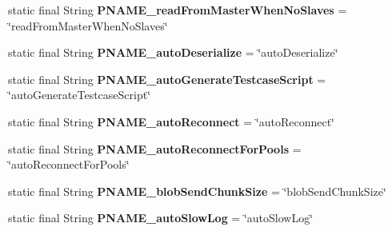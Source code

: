 \begin{DoxyCompactItemize}
static final String {\bfseries P\+N\+A\+M\+E\+\_\+read\+From\+Master\+When\+No\+Slaves} = \char`\"{}read\+From\+Master\+When\+No\+Slaves\char`\"{}
\item 
\mbox{\label{classcom_1_1mysql_1_1cj_1_1conf_1_1_property_definitions_ab3efc775d4d19fa8553c518063f45596}} 
static final String {\bfseries P\+N\+A\+M\+E\+\_\+auto\+Deserialize} = \char`\"{}auto\+Deserialize\char`\"{}
\item 
\mbox{\label{classcom_1_1mysql_1_1cj_1_1conf_1_1_property_definitions_a96991c41e4521168671ca79abc4354bb}} 
static final String {\bfseries P\+N\+A\+M\+E\+\_\+auto\+Generate\+Testcase\+Script} = \char`\"{}auto\+Generate\+Testcase\+Script\char`\"{}
\item 
\mbox{\label{classcom_1_1mysql_1_1cj_1_1conf_1_1_property_definitions_a8397ead57bfb1f84df15217b88d9b9b8}} 
static final String {\bfseries P\+N\+A\+M\+E\+\_\+auto\+Reconnect} = \char`\"{}auto\+Reconnect\char`\"{}
\item 
\mbox{\label{classcom_1_1mysql_1_1cj_1_1conf_1_1_property_definitions_acb67126ce870368616adf3d97df95047}} 
static final String {\bfseries P\+N\+A\+M\+E\+\_\+auto\+Reconnect\+For\+Pools} = \char`\"{}auto\+Reconnect\+For\+Pools\char`\"{}
\item 
\mbox{\label{classcom_1_1mysql_1_1cj_1_1conf_1_1_property_definitions_ac26d6d79ee4782897033246f468263d4}} 
static final String {\bfseries P\+N\+A\+M\+E\+\_\+blob\+Send\+Chunk\+Size} = \char`\"{}blob\+Send\+Chunk\+Size\char`\"{}
\item 
\mbox{\label{classcom_1_1mysql_1_1cj_1_1conf_1_1_property_definitions_a564d59b0940a7498eacad705862e7b7c}} 
static final String {\bfseries P\+N\+A\+M\+E\+\_\+auto\+Slow\+Log} = \char`\"{}auto\+Slow\+Log\char`\"{}
\item 
\mbox{\label{classcom_1_1mysql_1_1cj_1_1conf_1_1_property_definitions_aa28f630fe108b66847f82d4a5cda943e}} 

\end{DoxyCompactItemize}
